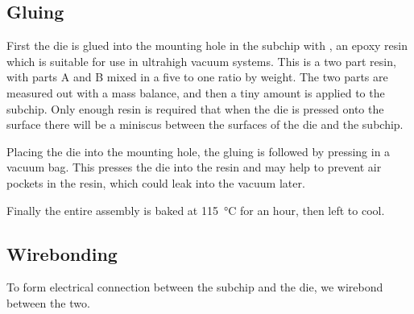 \subsection{Gluing}

First the die is glued into the mounting hole in the subchip with , an epoxy resin which is suitable for use in ultrahigh vacuum systems.
This is a two part resin, with parts A and B mixed in a five to one ratio by
weight. The two parts are measured out with a mass balance, and then a tiny
amount is applied to the subchip. Only enough resin is required that when the
die is pressed onto the surface there will be a miniscus between the surfaces
of the die and the subchip.

Placing the die into the mounting hole, the gluing is followed by pressing in a
vacuum bag. This presses the die into the resin and may help to prevent air
pockets in the resin, which could leak into the vacuum later.

Finally the entire assembly is baked at \SI{115}{\celsius} for an hour, then
left to cool.

\subsection{Wirebonding}

To form electrical connection between the subchip and the die, we wirebond
between the two.
